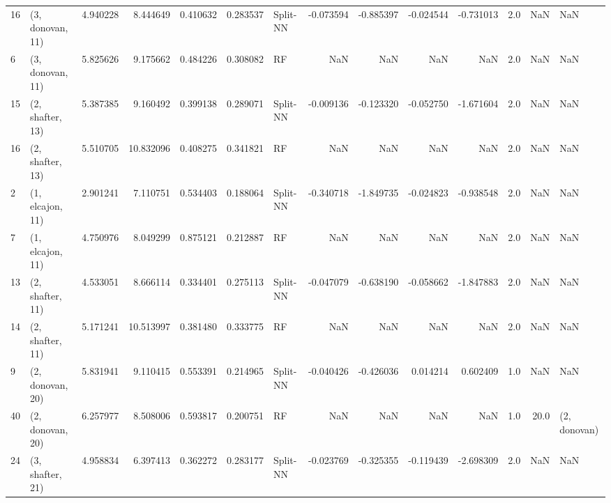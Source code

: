 \begin{tabular}{llrrrrlrrrrrrl}
16 &  (3, donovan, 11) &   4.940228 &   8.444649 &   0.410632 &  0.283537 &    Split-NN &       -0.073594 &     -0.885397 &      -0.024544 &    -0.731013 &            2.0 &    NaN &              NaN \\
6  &  (3, donovan, 11) &   5.825626 &   9.175662 &   0.484226 &  0.308082 &          RF &             NaN &           NaN &            NaN &          NaN &            2.0 &    NaN &              NaN \\
15 &  (2, shafter, 13) &   5.387385 &   9.160492 &   0.399138 &  0.289071 &    Split-NN &       -0.009136 &     -0.123320 &      -0.052750 &    -1.671604 &            2.0 &    NaN &              NaN \\
16 &  (2, shafter, 13) &   5.510705 &  10.832096 &   0.408275 &  0.341821 &          RF &             NaN &           NaN &            NaN &          NaN &            2.0 &    NaN &              NaN \\
2  &  (1, elcajon, 11) &   2.901241 &   7.110751 &   0.534403 &  0.188064 &    Split-NN &       -0.340718 &     -1.849735 &      -0.024823 &    -0.938548 &            2.0 &    NaN &              NaN \\
7  &  (1, elcajon, 11) &   4.750976 &   8.049299 &   0.875121 &  0.212887 &          RF &             NaN &           NaN &            NaN &          NaN &            2.0 &    NaN &              NaN \\
13 &  (2, shafter, 11) &   4.533051 &   8.666114 &   0.334401 &  0.275113 &    Split-NN &       -0.047079 &     -0.638190 &      -0.058662 &    -1.847883 &            2.0 &    NaN &              NaN \\
14 &  (2, shafter, 11) &   5.171241 &  10.513997 &   0.381480 &  0.333775 &          RF &             NaN &           NaN &            NaN &          NaN &            2.0 &    NaN &              NaN \\
9  &  (2, donovan, 20) &   5.831941 &   9.110415 &   0.553391 &  0.214965 &    Split-NN &       -0.040426 &     -0.426036 &       0.014214 &     0.602409 &            1.0 &    NaN &              NaN \\
40 &  (2, donovan, 20) &   6.257977 &   8.508006 &   0.593817 &  0.200751 &          RF &             NaN &           NaN &            NaN &          NaN &            1.0 &   20.0 &     (2, donovan) \\
24 &  (3, shafter, 21) &   4.958834 &   6.397413 &   0.362272 &  0.283177 &    Split-NN &       -0.023769 &     -0.325355 &      -0.119439 &    -2.698309 &            2.0 &    NaN &              NaN \\

\end{tabular}
